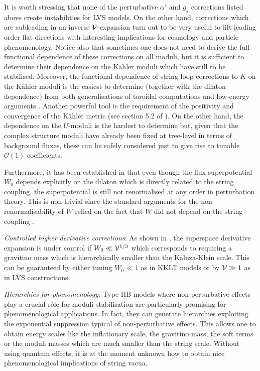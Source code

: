 \documentclass[11pt,a4paper]{article}
\newcommand{\vo}{\mathcal{V}}
\def\vo{{{\cal{V}}}}
\newcommand{\mc}{\mathcal}
\begin{document}
It is worth stressing that none of the perturbative $\alpha'$ and $g_s$ corrections listed above create instabilities for LVS models. On the other hand, corrections which are subleading in an inverse $\vo$-expansion turn out to be very useful to lift leading order flat directions with interesting implications for cosmology and particle phenomenology. Notice also that sometimes one does not need to derive the full functional dependence of these corrections on all moduli, but it is sufficient to determine their dependence on the K\"ahler moduli which have still to be stabilised. Moreover, the functional dependence of string loop corrections to $K$ on the K\"ahler moduli is the easiest to determine (together with the dilaton dependence) from both generalisations of toroidal computations and low-energy arguments \cite{Cicoli:2007xp, Burgess:2010sy}. Another powerful tool is the requirement of the positivity and convergence of the K\"ahler metric (see section 5.2 of \cite{Conlon:2006gv}). On the other hand, the dependence on the $U$-moduli is the hardest to determine but, given that the complex structure moduli have already been fixed at tree-level in terms of background fluxes, these can be safely considered just to give rise to tunable $\mc{O}(1)$ coefficients. 

Furthermore, it has been established in \cite{Burgess:2005jx} that even though the flux superpotential $W_0$ depends explicitly on the dilaton which is directly related to the string coupling, the superpotential is still not renormalised at any order in perturbation theory. This is non-trivial since the standard arguments for the non-renormalisability of $W$ relied on the fact that $W$ did not depend on the string coupling \cite{Witten:1985bz, Burgess:1985zz, Dine:1986vd}.
 
\item \emph{Controlled higher derivative corrections}: As shown in \cite{Cicoli:2013swa}, the superspace derivative expansion is under control if $W_0\ll \vo^{1/3}$ which corresponds to requiring a gravitino mass which is hierarchically smaller than the Kaluza-Klein scale. This can be guaranteed by either tuning $W_0\ll 1$ as in KKLT models or by $\vo \gg 1$ as in LVS constructions.

\item \emph{Hierarchies for phenomenology}: Type IIB models where non-perturbative effects play a crucial r\^ole for moduli stabilisation are particularly promising for phenomenological applications. In fact, they can generate hierarchies exploiting the exponential suppression typical of non-perturbative effects. This allows one to obtain energy scales like the inflationary scale, the gravitino mass, the soft terms or the moduli masses which are much smaller than the string scale. Without using quantum effects, it is at the moment unknown how to obtain nice phenomenological implications of string vacua.
\end{document}
